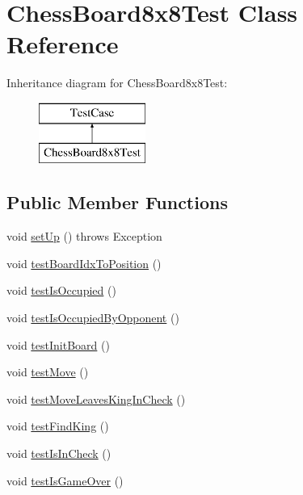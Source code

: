 \hypertarget{class_chess_board8x8_test}{}\section{Chess\+Board8x8\+Test Class Reference}
\label{class_chess_board8x8_test}
Inheritance diagram for Chess\+Board8x8\+Test\+:\begin{figure}[H]
\begin{center}
\leavevmode
\includegraphics[height=2.000000cm]{class_chess_board8x8_test}
\end{center}
\end{figure}
\subsection*{Public Member Functions}
\begin{DoxyCompactItemize}
\item 
void \mbox{\hyperlink{class_chess_board8x8_test_afebde4bbc3c2605a554bb3e974108969}{set\+Up}} ()  throws Exception 
\item 
void \mbox{\hyperlink{class_chess_board8x8_test_a03828a60620e811e0ec03c473349b27e}{test\+Board\+Idx\+To\+Position}} ()
\item 
void \mbox{\hyperlink{class_chess_board8x8_test_aa806b2ef91d514dc4512a5d83d589793}{test\+Is\+Occupied}} ()
\item 
void \mbox{\hyperlink{class_chess_board8x8_test_a618b9e28857d806c997a95b460af6096}{test\+Is\+Occupied\+By\+Opponent}} ()
\item 
void \mbox{\hyperlink{class_chess_board8x8_test_ad95f3f9c7e4c41d5f18016bea3a4f9a4}{test\+Init\+Board}} ()
\item 
void \mbox{\hyperlink{class_chess_board8x8_test_a630e1345d39197c0771f835f52b95f78}{test\+Move}} ()
\item 
void \mbox{\hyperlink{class_chess_board8x8_test_a4404a29c2dda879be760b3eb06deb16e}{test\+Move\+Leaves\+King\+In\+Check}} ()
\item 
void \mbox{\hyperlink{class_chess_board8x8_test_a7f2da81ad7f3b8009164ddb09b5f0328}{test\+Find\+King}} ()
\item 
void \mbox{\hyperlink{class_chess_board8x8_test_a8732515f549e0ea68a0da19682eb9459}{test\+Is\+In\+Check}} ()
\item 
void \mbox{\hyperlink{class_chess_board8x8_test_aeb05e4785df2557766c7c651a4edd278}{test\+Is\+Game\+Over}} ()
\end{DoxyCompactItemize}


